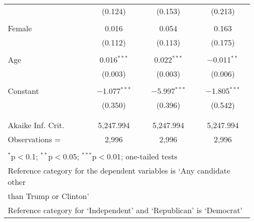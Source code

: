 \documentclass[12pt]{article}
\begin{document}
\begin{appendices}
\begin{refsection}
\begin{table}[!t]
\begin{adjustbox}{width=0.6\textwidth,center}
\begin{tabular}{@{\extracolsep{5pt}}lccc}
  & (0.124) & (0.153) & (0.213) \\ 
  & & & \\ 
 Female & 0.016 & 0.054 & 0.163 \\ 
  & (0.112) & (0.113) & (0.175) \\ 
  & & & \\ 
 Age & 0.016$^{***}$ & 0.022$^{***}$ & $-$0.011$^{**}$ \\ 
  & (0.003) & (0.003) & (0.006) \\ 
  & & & \\ 
 Constant & $-$1.077$^{***}$ & $-$5.997$^{***}$ & $-$1.805$^{***}$ \\ 
  & (0.350) & (0.396) & (0.542) \\ 
  & & & \\
\hline \\[-1.8ex] 
Akaike Inf. Crit. & 5,247.994 & 5,247.994 & 5,247.994 \\ 
Observations =  & 2,996 & 2,996 & 2,996 \\
\hline 
\hline \\[-1.8ex] 
\multicolumn{4}{l}{\footnotesize $^{*}$p$<$0.1; $^{**}$p$<$0.05; $^{***}$p$<$0.01; one-tailed tests} \\ 
\multicolumn{4}{l}{\footnotesize Reference category for the dependent variables is `Any candidate other} \\
\multicolumn{4}{l}{\footnotesize than Trump or Clinton'} \\
\multicolumn{4}{l}{\footnotesize Reference category for `Independent' and `Republican' is `Democrat'} \\
\end{tabular} 
\end{adjustbox}
\end{table}


\end{refsection}
\end{appendices}
\end{document}
